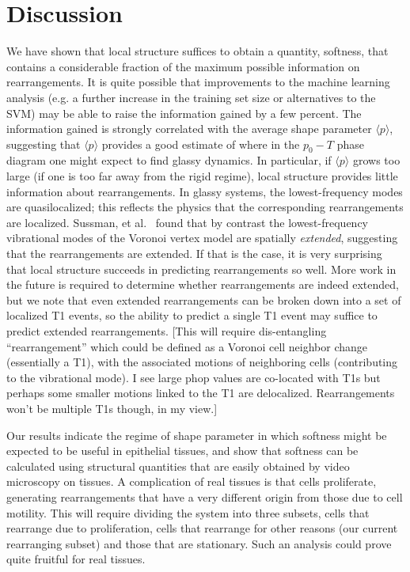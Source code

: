 \documentclass[twoside,twocolumn,9pt]{article}
\newcommand{\tasadd}[1]{{\color{blue}#1}} %
\begin{document}
\section{Discussion}
We have shown that local structure suffices to obtain a quantity, softness, that contains a considerable fraction of the maximum possible information on rearrangements. It is quite possible that improvements to the machine learning analysis (e.g. a further increase in the training set size or alternatives to the SVM) may be able to raise the information gained by a few percent. The information gained is strongly correlated with the average shape parameter $\langle p \rangle$, suggesting that $\langle p \rangle$ provides a good estimate of where in the $p_0-T$ phase diagram one might expect to find glassy dynamics. In particular, if $\langle p \rangle$ grows too large (if one is too far away from the rigid regime), local structure provides little information about rearrangements. 
In glassy systems, the lowest-frequency modes are quasilocalized; this reflects the physics that the corresponding rearrangements are localized. Sussman, et al.~\cite{SussmanPaoluzziMarchetti2018} found that by contrast the lowest-frequency vibrational modes of the 
Voronoi vertex model are spatially \emph{extended}, suggesting that the rearrangements are extended. If that is the case, it is very surprising that local structure succeeds in predicting rearrangements so well. More work in the future is required to determine whether rearrangements are indeed extended, but we note that even extended rearrangements can be broken down into a set of localized T1 events, so the ability to predict a single T1 event may suffice to predict extended rearrangements. \tasadd{[This will require dis-entangling ``rearrangement'' which could be defined as a Voronoi cell neighbor change (essentially a T1), with the associated motions of neighboring cells (contributing to the vibrational mode). I see large phop values are co-located with T1s but perhaps some smaller motions linked to the T1 are delocalized. Rearrangements won't be multiple T1s though, in my view.]}  

Our results  indicate the regime of shape parameter in which softness might be expected to be useful in epithelial tissues, and show that softness can be calculated using structural quantities that are easily obtained by video microscopy on tissues. A complication of real tissues is that cells proliferate, generating rearrangements that have a very different origin from those due to cell motility. This will require dividing the system into three subsets, cells that rearrange due to proliferation, cells that rearrange for other reasons (our current rearranging subset) and those that are stationary. Such an analysis could prove quite fruitful for real tissues.
\end{document}
